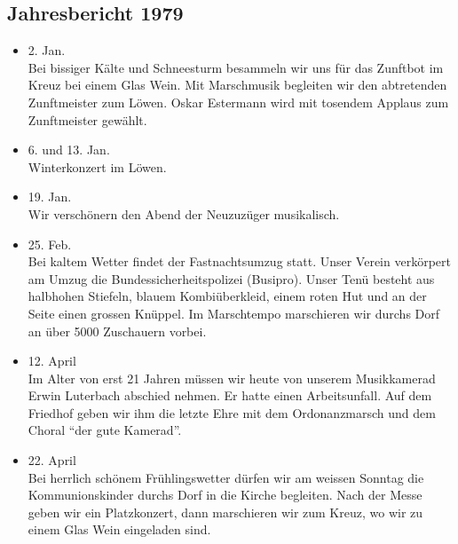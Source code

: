 \subsection{Jahresbericht 1979}

\begin{history}


    \begin{itemize}

        \item[]2. Jan.\\
        Bei bissiger Kälte und Schneesturm besammeln wir uns für das Zunftbot im
        Kreuz bei einem Glas Wein. Mit Marschmusik begleiten wir den abtretenden
        Zunftmeister zum Löwen. Oskar Estermann wird mit tosendem Applaus zum
        Zunftmeister gewählt.

        \item[]6. und 13. Jan.\\
        Winterkonzert im Löwen.

        \item[]19. Jan.\\
        Wir verschönern den Abend der Neuzuzüger musikalisch.

        \item[]25. Feb.\\
        Bei kaltem Wetter findet der Fastnachtsumzug statt. Unser Verein
        verkörpert am Umzug die Bundessicherheitspolizei (Busipro). Unser Tenü
        besteht aus halbhohen Stiefeln, blauem Kombiüberkleid, einem roten Hut
        und an der Seite einen grossen Knüppel. Im Marschtempo marschieren wir
        durchs Dorf an über 5000 Zuschauern vorbei.

        \item[]12. April\\
        Im Alter von erst 21 Jahren müssen wir heute von unserem Musikkamerad
        Erwin Luterbach abschied nehmen. Er hatte einen Arbeitsunfall. Auf dem
        Friedhof geben wir ihm die letzte Ehre mit dem Ordonanzmarsch und dem
        Choral \enquote{der gute Kamerad}.

        \item[]22. April\\
        Bei herrlich schönem Frühlingswetter dürfen wir am weissen Sonntag die
        Kommunionskinder durchs Dorf in die Kirche begleiten. Nach der Messe
        geben wir ein Platzkonzert, dann marschieren wir zum Kreuz, wo wir zu
        einem Glas Wein eingeladen sind.


\end{itemize}
\end{history}
